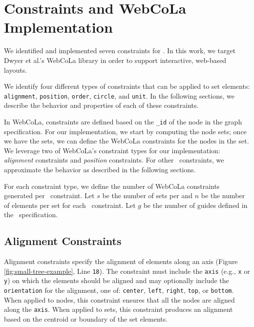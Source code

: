 \section{\projectname Constraints and WebCoLa Implementation}
\label{sec:constraints}
We identified and implemented seven constraints for \projectname. In 
this work, we target  Dwyer et al.'s WebCoLa library \cite{WebCoLa} in 
order to support interactive, web-based layouts. 

We identify four different types of
constraints that can be applied to set elements: \texttt{alignment},
\texttt{position}, \texttt{order}, \texttt{circle}, and \texttt{unit}. In
the following sections, we describe the behavior and properties of each of
these constraints.

In WebCoLa, constraints are defined based on the \texttt{\_id} of the
node in the graph specification. For our implementation, we start by
computing the node sets; once we have the sets, we can define the WebCoLa
constraints for the nodes in the set. We leverage two of WebCoLa's
constraint types for our implementation: \emph{alignment} constraints 
and \emph{position} constraints. For other \projectname\ constraints, we
approximate the behavior as described in the following sections.

For each constraint type, we define the number of WebCoLa constraints
generated per \projectname\ constraint. Let $s$ be the number of sets per 
and $n$ be the number of elements per set for each \projectname\ constraint.
Let $g$ be the number of guides defined in the \projectname\ specification.

\subsection{Alignment Constraints}
 Alignment constraints
specify the alignment of elements along an axis (Figure
\ref{fig:small-tree-example}, Line \texttt{18}). The constraint must
include the \texttt{axis} (e.g., \texttt{x} or \texttt{y}) on which the
elements should be aligned and may optionally include the
\texttt{orientation} for the alignment, one of: \texttt{center},
\texttt{left}, \texttt{right}, \texttt{top}, or \texttt{bottom}. When
applied to nodes, this constraint ensures that all the nodes are aligned
along the \texttt{axis}. When applied to sets, this constraint produces an
alignment based on the centroid or boundary of the set elements.

